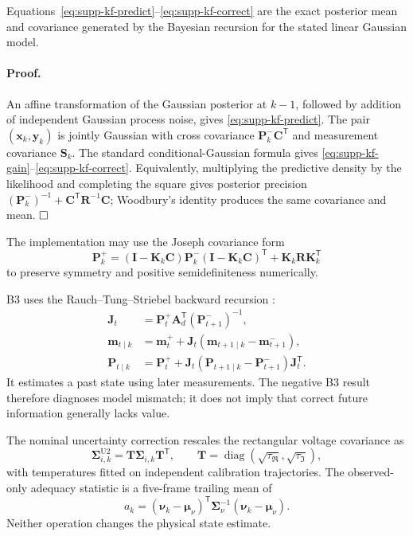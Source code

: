 \begin{theorem}
Equations~\eqref{eq:supp-kf-predict}--\eqref{eq:supp-kf-correct} are the exact posterior mean and covariance generated by the Bayesian recursion for the stated linear Gaussian model.
\end{theorem}

\paragraph{Proof.}
An affine transformation of the Gaussian posterior at $k-1$, followed by addition of independent Gaussian process noise, gives \eqref{eq:supp-kf-predict}. The pair $(\bm x_k,\bm y_k)$ is jointly Gaussian with cross covariance $\bm P_k^-\bm C^{\mathsf T}$ and measurement covariance $\bm S_k$. The standard conditional-Gaussian formula gives \eqref{eq:supp-kf-gain}--\eqref{eq:supp-kf-correct}. Equivalently, multiplying the predictive density by the likelihood and completing the square gives posterior precision $(\bm P_k^-)^{-1}+\bm C^{\mathsf T}\bm R^{-1}\bm C$; Woodbury's identity produces the same covariance and mean. $\hfill\square$

The implementation may use the Joseph covariance form
\begin{equation}
 \bm P_k^+=(\bm I-\bm K_k\bm C)\bm P_k^-
 (\bm I-\bm K_k\bm C)^{\mathsf T}+\bm K_k\bm R\bm K_k^{\mathsf T}
 \label{eq:supp-joseph-form}
\end{equation}
to preserve symmetry and positive semidefiniteness numerically.

B3 uses the Rauch--Tung--Striebel backward recursion \cite{rauch1965smoothing}:
\begin{align}
 \bm J_t&=\bm P_t^+\bm A_d^{\mathsf T}(\bm P_{t+1}^-)^{-1},\\
 \bm m_{t\mid k}&=\bm m_t^+
 +\bm J_t(\bm m_{t+1\mid k}-\bm m_{t+1}^-),\\
 \bm P_{t\mid k}&=\bm P_t^+
 +\bm J_t(\bm P_{t+1\mid k}-\bm P_{t+1}^-)
 \bm J_t^{\mathsf T}.
 \label{eq:supp-rts}
\end{align}
It estimates a past state using later measurements. The negative B3 result therefore diagnoses model mismatch; it does not imply that correct future information generally lacks value.

The nominal uncertainty correction rescales the rectangular voltage covariance as
\begin{equation}
 \bm\Sigma_{i,k}^{\mathrm{U2}}=\bm T\bm\Sigma_{i,k}\bm T^{\mathsf T},
 \qquad \bm T=\operatorname{diag}(\sqrt{\tau_{\Re}},\sqrt{\tau_{\Im}}),
 \label{eq:supp-temperature-map}
\end{equation}
with temperatures fitted on independent calibration trajectories. The observed-only adequacy statistic is a five-frame trailing mean of
\begin{equation}
 a_k=(\bm\nu_k-\bm\mu_{\nu})^{\mathsf T}
 \bm\Sigma_{\nu}^{-1}(\bm\nu_k-\bm\mu_{\nu}).
 \label{eq:supp-adequacy-statistic}
\end{equation}
Neither operation changes the physical state estimate.

